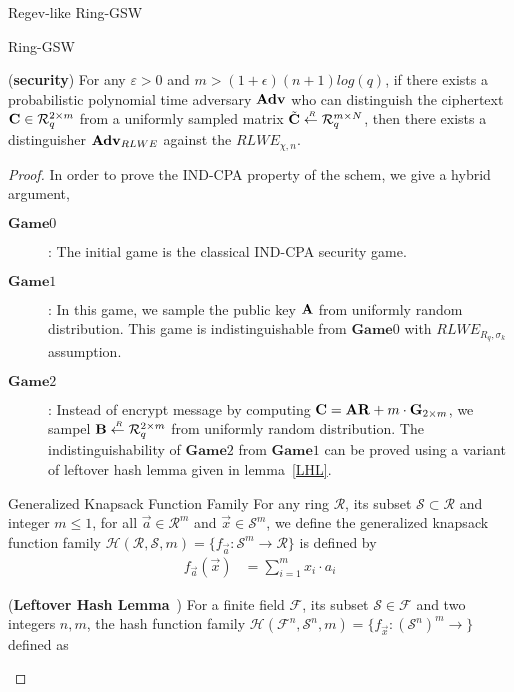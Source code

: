 \begin{subsection}{Regev-like Ring-GSW}
\begin{paragraph}{Ring-GSW}
    \begin{lemma}{(\textbf{security})}
      For any $\varepsilon > 0$ and $m > (1+\epsilon)(n+1) log(q)$,
      if there exists a probabilistic polynomial time adversary $\mathbf{Adv}$ who can distinguish the ciphertext $\mathbf{C} \in {\mathcal{R}}_q^{2 \times m}$
      from a uniformly sampled matrix $\tilde{\mathbf{C}} \stackrel{{\scriptscriptstyle \mkern4mu R}}{\gets} {\mathcal{R}}_q^{m \times N}$,
      then there exists a distinguisher $\mathbf{Adv}_{RLWE}$ against the $RLWE_{\chi, n}$.
    \end{lemma}
    \begin{proof}
      In order to prove the IND-CPA property of the schem, we give a hybrid argument,
      \begin{description}
      \item[$\textbf{Game} 0$]:
        The initial game is the classical IND-CPA security game.
      \item[$\textbf{Game} 1$]:
        In this game, we sample the public key $\mathbf{A}$ from uniformly random distribution. This game is indistinguishable from $\textbf{Game} 0$ with $RLWE_{R_q, \sigma_k}$ assumption.
      \item[$\textbf{Game} 2$]:
        Instead of encrypt message by computing $\mathbf{C} = \mathbf{A} \mathbf{R} + m \cdot \mathbf{G}_{2\times m}$, we sampel $\mathbf{B} \stackrel{{\scriptscriptstyle \mkern4mu R}}{\gets} {\mathcal{R}}_q^{2 \times m}$ from uniformly random distribution.
        The indistinguishability of $\textbf{Game} 2$ from $\textbf{Game} 1$ can be proved using a variant of leftover hash lemma given in lemma~\ref{LHL}.
      \end{description}

      \begin{definition}{Generalized Knapsack Function Family}{\cite{DBLP:conf/focs/Micciancio02}}
        For any ring $\mathcal{R}$, its subset $\mathcal{S} \subset \mathcal{R}$ and integer $m \leq 1$, for all $\vec{a} \in \mathcal{R}^m$ and $\vec{x} \in \mathcal{S}^m$, we define the generalized knapsack function family $\mathcal{H}(\mathcal{R}, \mathcal{S}, m) = \{f_{\vec{a}} : \mathcal{S}^m \to \mathcal{R}\}$ is defined by
        \begin{align*}
          f_{\vec{a}}(\vec{x}) &= \sum_{i=1}^m x_i \cdot a_i
        \end{align*}
      \end{definition}
      
      \begin{lemma}\label{LHL}{(\textbf{Leftover Hash Lemma}~\cite{DBLP:conf/stoc/ImpagliazzoLL89}\cite{DBLP:conf/focs/Micciancio02})}
        For a finite field $\mathcal{F}$, its subset $\mathcal{S} \in \mathcal{F}$ and two integers $n, m$, the hash function family $\mathcal{H}(\mathcal{F}^n, \mathcal{S}^n, m) = \{f_{\vec{x}} : (\mathcal{S}^n)^m \to \}$ defined as
        
      \end{lemma}
    \end{proof}
    {}
  \end{paragraph}
  
\end{subsection}


